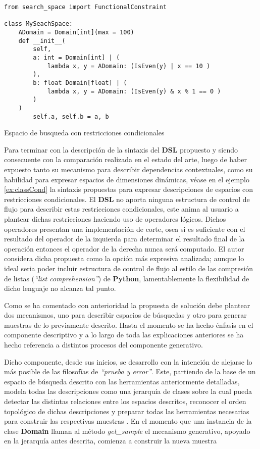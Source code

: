 \begin{listing}[!ht]
    \begin{verbatim}
from search_space import FunctionalConstraint

class MySeachSpace:
    ADomain = Domain[int](max = 100)
    def __init__(
        self, 
        a: int = Domain[int] | (
            lambda x, y = ADomain: (IsEven(y) | x == 10 )
        ),
        b: float Domain[float] | (
            lambda x, y = ADomain: (IsEven(y) & x % 1 == 0 )
        )             
    )
        self.a, self.b = a, b

    \end{verbatim}
    \caption{Espacio de busqueda con restricciones condicionales}
    \label{ex:classCond}
\end{listing}

Para terminar con la descripción de la sintaxis del {\bf DSL} propuesto y siendo consecuente con la comparación realizada
en el estado del arte, luego de haber expuesto tanto su mecanismo para describir dependencias contextuales, como su
habilidad para expresar espacios de dimensiones dinámicas, véase en el ejemplo \ref{ex:classCond} la sintaxis propuestas para
expresar descripciones de espacios con restricciones condicionales. El {\bf DSL} no aporta ninguna estructura de control
de flujo para describir estas restricciones condicionales, este anima al usuario a plantear dichas restricciones
haciendo uso de operadores lógicos. Dichos operadores presentan una implementación de corte, osea si es suficiente
con el resultado del operador de la izquierda para determinar el resultado final de la operación entonces el operador
de la derecha nunca será computado. El autor considera dicha propuesta como la opción más expresiva analizada; aunque
lo ideal seria poder incluir estructura de control de flujo al estilo de las compresión de listas  ({\it “list comprehension”})
de {\bf Python}, lamentablemente la flexibilidad de dicho lenguaje no alcanza tal punto.

Como se ha comentado con anterioridad la propuesta de solución debe plantear dos mecanismos, uno para describir espacios
de búsquedas y otro para generar muestras de lo previamente descrito. Hasta el momento se ha hecho énfasis en el componente
descriptivo y a lo largo de toda las explicaciones anteriores se ha hecho referencia a distintos procesos del componente generativo.

Dicho componente, desde sus inicios, se desarrollo con la intención de alejarse lo más posible de las filosofías de
    {\it “prueba y error”}. Este, partiendo de la base de un espacio de búsqueda descrito con las herramientas anteriormente
detalladas, modela todas las descripciones como una jerarquía de clases sobre la cual pueda detectar las distintas
relaciones entre los espacios descritos, reconocer el orden topológico de dichas descripciones y preparar todas las
herramientas necesarias para construir las respectivas muestras . En el momento que una instancia de la
clase {\bf Domain} llaman al método {\it get\_sample} el mecanismo generativo, apoyado en la jerarquía antes descrita, comienza
a construir la nueva muestra


